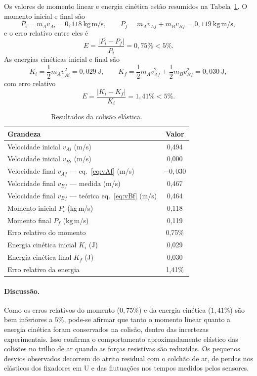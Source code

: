 \documentclass[12pt,a4paper]{article}
\begin{document}
Os valores de momento linear e energia cinética estão resumidos na
Tabela~\ref{tab:result-el}. O momento inicial e final são
\[
P_i = m_A v_{Ai} = 0{,}118~\mathrm{kg\,m/s}, \qquad
P_f = m_A v_{Af} + m_B v_{Bf} = 0{,}119~\mathrm{kg\,m/s},
\]
e o erro relativo entre eles é
\[
E = \frac{|P_i - P_f|}{P_i} = 0{,}75\% < 5\%.
\]
As energias cinéticas inicial e final são
\[
K_i = \frac{1}{2}m_A v_{Ai}^2 = 0{,}029~\mathrm{J}, \qquad
K_f = \frac{1}{2}m_A v_{Af}^2 + \frac{1}{2}m_B v_{Bf}^2 = 0{,}030~\mathrm{J},
\]
com erro relativo
\[
E = \frac{|K_i - K_f|}{K_i} = 1{,}41\% < 5\%.
\]

\begin{table}[!h]
	\centering
	\begin{tabular}{|l|c|} \hline \hline
	Grandeza & Valor \\ \hline \hline
	Velocidade inicial $v_{Ai}$ (m/s)        & 0,494 \\ \hline
	Velocidade inicial $v_{Bi}$ (m/s)        & 0,000 \\ \hline
	Velocidade final $v_{Af}$ --- eq.~\eqref{eq:vAf} (m/s) & $-0{,}030$ \\ \hline
	Velocidade final $v_{Bf}$ --- medida (m/s)   & 0,467 \\ \hline
	Velocidade final $v_{Bf}$ --- teórica eq.~\eqref{eq:vBf} (m/s) & 0,464 \\ \hline
	Momento inicial $P_i$ (kg\,m/s)          & 0,118 \\ \hline
	Momento final $P_f$ (kg\,m/s)            & 0,119 \\ \hline
	Erro relativo do momento                 & 0,75\% \\ \hline
	Energia cinética inicial $K_i$ (J)       & 0,029 \\ \hline
	Energia cinética final $K_f$ (J)         & 0,030 \\ \hline
	Erro relativo da energia                 & 1,41\% \\ \hline \hline
	\end{tabular}
	\caption{Resultados da colisão elástica.}
	\label{tab:result-el}
\end{table}

\paragraph{Discussão.} Como os erros relativos do momento ($0{,}75\%$) e da energia cinética
($1{,}41\%$) são bem inferiores a $5\%$, pode-se afirmar que tanto o momento linear quanto a
energia cinética foram conservados na colisão, dentro das incertezas experimentais. Isso confirma
o comportamento aproximadamente elástico das colisões no trilho de ar quando as forças resistivas
são reduzidas. Os pequenos desvios observados decorrem do atrito residual com o colchão de ar, de
perdas nos elásticos dos fixadores em U e das flutuações nos tempos medidos pelos sensores.
\end{document}
